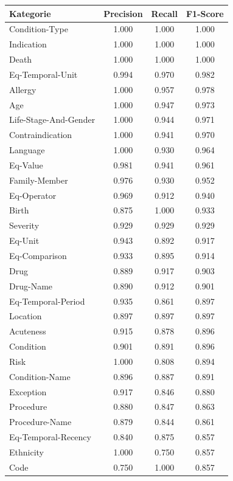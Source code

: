 \begin{table}[htbp]
\centering
\begin{tabular}{p{5cm}ccc}
\toprule
\textbf{Kategorie} & \textbf{Precision} & \textbf{Recall} & \textbf{F1-Score} \\
\midrule
Condition-Type & 1.000 & 1.000 & 1.000 \\
Indication & 1.000 & 1.000 & 1.000 \\
Death & 1.000 & 1.000 & 1.000 \\
Eq-Temporal-Unit & 0.994 & 0.970 & 0.982 \\
Allergy & 1.000 & 0.957 & 0.978 \\
Age & 1.000 & 0.947 & 0.973 \\
Life-Stage-And-Gender & 1.000 & 0.944 & 0.971 \\
Contraindication & 1.000 & 0.941 & 0.970 \\
Language & 1.000 & 0.930 & 0.964 \\
Eq-Value & 0.981 & 0.941 & 0.961 \\
Family-Member & 0.976 & 0.930 & 0.952 \\
Eq-Operator & 0.969 & 0.912 & 0.940 \\
Birth & 0.875 & 1.000 & 0.933 \\
Severity & 0.929 & 0.929 & 0.929 \\
Eq-Unit & 0.943 & 0.892 & 0.917 \\
Eq-Comparison & 0.933 & 0.895 & 0.914 \\
Drug & 0.889 & 0.917 & 0.903 \\
Drug-Name & 0.890 & 0.912 & 0.901 \\
Eq-Temporal-Period & 0.935 & 0.861 & 0.897 \\
Location & 0.897 & 0.897 & 0.897 \\
Acuteness & 0.915 & 0.878 & 0.896 \\
Condition & 0.901 & 0.891 & 0.896 \\
Risk & 1.000 & 0.808 & 0.894 \\
Condition-Name & 0.896 & 0.887 & 0.891 \\
Exception & 0.917 & 0.846 & 0.880 \\
Procedure & 0.880 & 0.847 & 0.863 \\
Procedure-Name & 0.879 & 0.844 & 0.861 \\
Eq-Temporal-Recency & 0.840 & 0.875 & 0.857 \\
Ethnicity & 1.000 & 0.750 & 0.857 \\
Code & 0.750 & 1.000 & 0.857 \\

\end{tabular}
\end{table}
